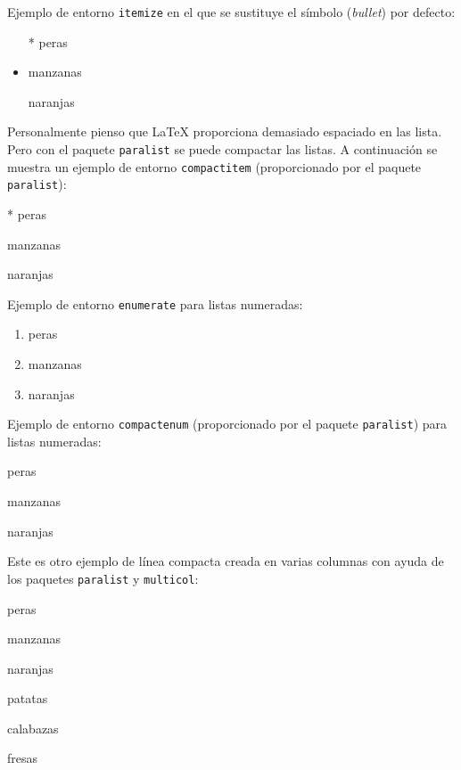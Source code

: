 \documentclass[11pt,a4paper]{article}
\begin{document}
\noindent Ejemplo de entorno {\tt itemize} en el que se sustituye el símbolo (\emph{bullet}) por defecto:

\begin{itemize}
	\item[*] peras
	\item manzanas
	\item[\ding{170}] naranjas
\end{itemize}


Personalmente pienso que \LaTeX{} proporciona demasiado espaciado en las lista. Pero con el paquete \texttt{paralist} se puede compactar las listas. A continuación se muestra un ejemplo de entorno {\tt compactitem} (proporcionado por el paquete \texttt{paralist}):

\begin{compactitem}
	\item[*] peras
	\item manzanas
	\item[\ding{170}] naranjas
\end{compactitem}



\bigskip %

\noindent Ejemplo de entorno {\tt enumerate} para listas numeradas:

\begin{enumerate}
	\item peras
	\item manzanas
	\item naranjas
\end{enumerate}


\newpage

\noindent Ejemplo de entorno {\tt compactenum} (proporcionado por el paquete \texttt{paralist}) para listas numeradas:

\begin{compactenum}
	\item peras
	\item manzanas
	\item naranjas
\end{compactenum}


\bigskip

\noindent Este es otro ejemplo de línea compacta creada en varias columnas con ayuda de los paquetes \texttt{paralist} y \texttt{multicol}:
\begin{multicols}{2} %
	\begin{compactenum}
		\item peras
		\item manzanas
		\item naranjas
		\item patatas
		\item calabazas
		\item fresas
	\end{compactenum}
\end{multicols}
\end{document}
